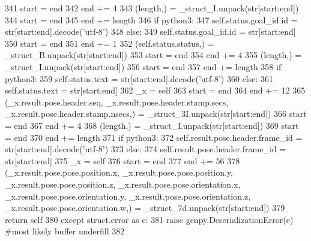 \begin{DoxyCode}
341       start = end
342       end += 4
343       (length,) = \_struct\_I.unpack(str[start:end])
344       start = end
345       end += length
346       \textcolor{keywordflow}{if} python3:
347         self.status.goal\_id.id = str[start:end].decode(\textcolor{stringliteral}{'utf-8'})
348       \textcolor{keywordflow}{else}:
349         self.status.goal\_id.id = str[start:end]
350       start = end
351       end += 1
352       (self.status.status,) = \_struct\_B.unpack(str[start:end])
353       start = end
354       end += 4
355       (length,) = \_struct\_I.unpack(str[start:end])
356       start = end
357       end += length
358       \textcolor{keywordflow}{if} python3:
359         self.status.text = str[start:end].decode(\textcolor{stringliteral}{'utf-8'})
360       \textcolor{keywordflow}{else}:
361         self.status.text = str[start:end]
362       \_x = self
363       start = end
364       end += 12
365       (\_x.result.pose.header.seq, \_x.result.pose.header.stamp.secs, \_x.result.pose.header.stamp.nsecs,) = 
      \_struct\_3I.unpack(str[start:end])
366       start = end
367       end += 4
368       (length,) = \_struct\_I.unpack(str[start:end])
369       start = end
370       end += length
371       \textcolor{keywordflow}{if} python3:
372         self.result.pose.header.frame\_id = str[start:end].decode(\textcolor{stringliteral}{'utf-8'})
373       \textcolor{keywordflow}{else}:
374         self.result.pose.header.frame\_id = str[start:end]
375       \_x = self
376       start = end
377       end += 56
378       (\_x.result.pose.pose.position.x, \_x.result.pose.pose.position.y, \_x.result.pose.pose.position.z, 
      \_x.result.pose.pose.orientation.x, \_x.result.pose.pose.orientation.y, \_x.result.pose.pose.orientation.z, 
      \_x.result.pose.pose.orientation.w,) = \_struct\_7d.unpack(str[start:end])
379       \textcolor{keywordflow}{return} self
380     \textcolor{keywordflow}{except} struct.error \textcolor{keyword}{as} e:
381       \textcolor{keywordflow}{raise} genpy.DeserializationError(e) \textcolor{comment}{#most likely buffer underfill}
382 
\end{DoxyCode}
